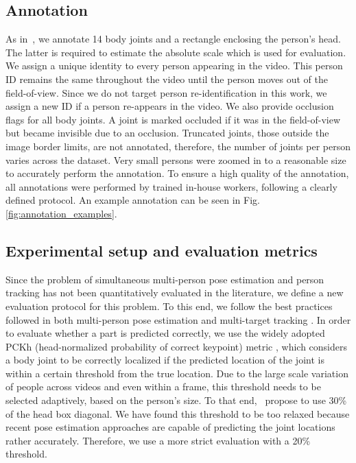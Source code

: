 \documentclass[10pt,twocolumn,letterpaper]{article}
\begin{document}
\subsection{Annotation}
As in~\cite{andriluka_cvpr2014}, we annotate 14 body joints and a rectangle enclosing the person's head. The latter is required to estimate the absolute scale which is used for evaluation. We assign a unique identity to every person appearing in the video. This person ID remains the same throughout the video until the person moves out of the field-of-view. Since we do not target person re-identification in this work, we assign a new ID if a person re-appears in the video.  We also provide occlusion flags for all body joints. A joint is marked occluded if it was in the field-of-view but became invisible due to an occlusion. Truncated joints, \ie those outside the image border limits, are not annotated, therefore, the number of joints per person varies across the dataset. Very small persons were zoomed in to a reasonable size to accurately perform the annotation. To ensure a high quality of the annotation, all annotations were performed by trained in-house workers, following a clearly defined protocol. An example annotation can be seen in Fig. \ref{fig:annotation_examples}.


\subsection{Experimental setup and evaluation metrics}
\label{sec:metrics}
Since the problem of simultaneous multi-person pose estimation and person tracking has not been quantitatively evaluated in the literature, we define a new evaluation protocol for this problem. To this end, we follow the best practices followed in both multi-person pose estimation \cite{pishchulin2016deepcut} and multi-target tracking \cite{milan2016mot16}. In order to evaluate whether a part is predicted correctly, we use the widely adopted PCKh (head-normalized probability of correct keypoint) metric \cite{andriluka_cvpr2014}, which considers a body joint to be correctly localized if the predicted location of the joint is within a certain threshold from the true location. Due to the large scale variation of people across videos and even within a frame, this threshold needs to be selected adaptively, based on the person's size. To that end,~\cite{andriluka_cvpr2014} propose to use 30\% of the head box diagonal.
We have found this threshold to be too relaxed because recent pose estimation approaches are capable of predicting the joint locations rather accurately. Therefore, we use a more strict evaluation with a 20\% threshold.
\end{document}
